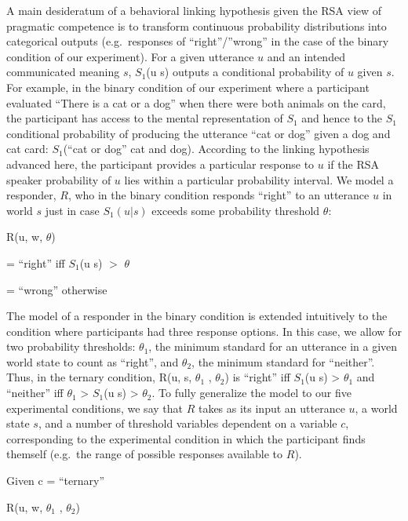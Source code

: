 \documentclass[man]{apa6}
\theoremstyle{definition}
\theoremstyle{definition}
\theoremstyle{definition}
\theoremstyle{remark}
\begin{document}
A main desideratum of a behavioral linking hypothesis given the RSA view
of pragmatic competence is to transform continuous probability
distributions into categorical outputs (e.g.~responses of
\enquote{right}/''wrong'' in the case of the binary condition of our
experiment). For a given utterance \(u\) and an intended communicated
meaning \(s\), \(S_1\)(u \textbar{} s) outputs a conditional probability
of \(u\) given \(s\). For example, in the binary condition of our
experiment where a participant evaluated \enquote{There is a cat or a
dog} when there were both animals on the card, the participant has
access to the mental representation of \(S_1\) and hence to the \(S_1\)
conditional probability of producing the utterance \enquote{cat or dog}
given a dog and cat card: \(S_1\)(\enquote{cat or dog} \textbar{} cat
and dog). According to the linking hypothesis advanced here, the
participant provides a particular response to \(u\) if the RSA speaker
probability of \(u\) lies within a particular probability interval. We
model a responder, \(R\), who in the binary condition responds
\enquote{right} to an utterance \(u\) in world \(s\) just in case
\(S_1(u | s)\) exceeds some probability threshold \(\theta\):

R(u, w, \(\theta\))

= \enquote{right} iff \(S_1\)(u \textbar{} s) \(>\) \(\theta\)

= \enquote{wrong} otherwise

The model of a responder in the binary condition is extended intuitively
to the condition where participants had three response options. In this
case, we allow for two probability thresholds: \(\theta_1\), the minimum
standard for an utterance in a given world state to count as
\enquote{right}, and \(\theta_2\), the minimum standard for
\enquote{neither}. Thus, in the ternary condition, R(u, s, \(\theta_1\)
, \(\theta_2\)) is \enquote{right} iff \(S_1\)(u \textbar{} s)
\textgreater{} \(\theta_1\) and \enquote{neither} iff \(\theta_1\)
\textgreater{} \(S_1\)(u \textbar{} s) \textgreater{} \(\theta_2\). To
fully generalize the model to our five experimental conditions, we say
that \(R\) takes as its input an utterance \(u\), a world state \(s\),
and a number of threshold variables dependent on a variable \(c\),
corresponding to the experimental condition in which the participant
finds themself (e.g.~the range of possible responses available to
\(R\)).

Given c = \enquote{ternary}

R(u, w, \(\theta_1\) , \(\theta_2\))
\end{document}
